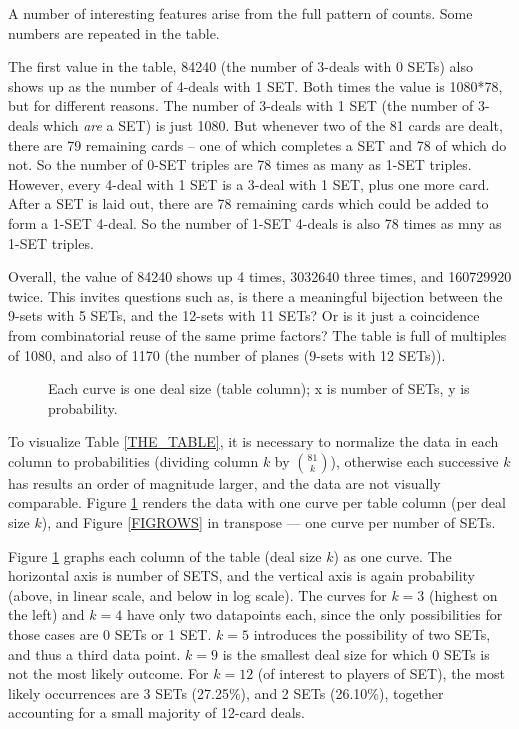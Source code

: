 \documentclass[10pt]{amsart}
\newcommand{\SET}{SET\texttrademark}  %
\begin{document}
A number of interesting features arise from the full pattern of counts. Some
numbers are repeated in the table.

The first value in the table, 84240 (the number of 3-deals with 0 SETs) also
shows up as the number of 4-deals with 1 SET. Both times the value is 1080*78,
but for different reasons. The number of 3-deals with 1 SET (the number of
3-deals which {\em are} a SET) is just 1080. But whenever two of the 81 cards
are dealt, there are 79 remaining cards -- one of which completes a SET and 78
of which do not. So the number of 0-SET triples are 78 times as many as 1-SET
triples. However, every 4-deal with 1 SET is a 3-deal with 1 SET, plus one more
card. After a SET is laid out, there are 78 remaining cards which could be added
to form a 1-SET 4-deal. So the number of 1-SET 4-deals is also 78 times as mny
as 1-SET triples.

Overall, the value of 84240 shows up 4 times, 3032640 three times, and 160729920
twice. This invites questions such as, is there a meaningful bijection between
the 9-sets with 5 SETs, and the 12-sets with 11 SETs? Or is it just a
coincidence from combinatorial reuse of the same prime factors? The table is
full of multiples of 1080, and also of 1170 (the number of planes (9-sets with
12 SETs)).

\begin{figure}[!htb]
  \caption{\label{FIGCOLS} Each curve is one deal size (table column); x is
    number of SETs, y is probability.}
\end{figure}

To visualize Table \ref{THE_TABLE}, it is necessary to normalize the data in
each column to probabilities (dividing column $k$ by $\binom{81}{k}$), otherwise
each successive $k$ has results an order of magnitude larger, and the data are
not visually comparable. Figure \ref{FIGCOLS} renders the data with one curve
per table column (per deal size $k$), and Figure \ref{FIGROWS} in transpose ---
one curve per number of SETs. 

Figure \ref{FIGCOLS} graphs each column of the table (deal size $k$) as one
curve. The horizontal axis is number of SETS, and the vertical axis is again
probability (above, in linear scale, and below in log scale). The curves for
$k=3$ (highest on the left) and $k=4$ have only two datapoints each, since the
only possibilities for those cases are 0 SETs or 1 SET. $k=5$ introduces the
possibility of two SETs, and thus a third data point. $k=9$ is the smallest deal
size for which 0 SETs is not the most likely outcome. For $k=12$ (of interest to
players of \SET), the most likely occurrences are 3 SETs (27.25\%), and 2 SETs
(26.10\%), together accounting for a small majority of 12-card deals.
\end{document}
